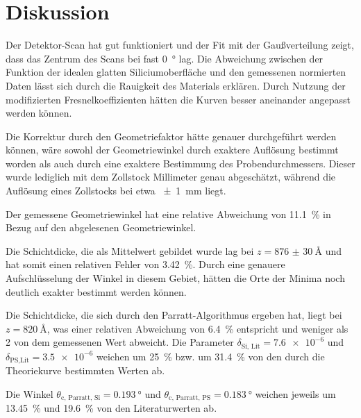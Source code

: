 \section{Diskussion}
\label{sec:Diskussion}

Der Detektor-Scan hat gut funktioniert und der Fit mit der Gaußverteilung zeigt, dass das Zentrum des Scans bei fast \SI{0}{\degree} lag. 
Die Abweichung zwischen der Funktion der idealen glatten Siliciumoberfläche und den gemessenen normierten Daten lässt sich durch die Rauigkeit des Materials erklären. Durch Nutzung der modifizierten Fresnelkoeffizienten hätten die Kurven besser aneinander angepasst werden können. 

Die Korrektur durch den Geometriefaktor hätte genauer durchgeführt werden können, wäre sowohl der Geometriewinkel durch exaktere Auflösung bestimmt worden als auch durch eine exaktere Bestimmung des Probendurchmessers. Dieser wurde lediglich mit dem Zollstock Millimeter genau abgeschätzt, während die Auflösung eines Zollstocks bei etwa \SI{\pm1}{\milli\meter} liegt.

Der gemessene Geometriewinkel hat eine relative Abweichung von \SI{11.1}{\percent} in Bezug auf den abgelesenen Geometriewinkel. 

Die Schichtdicke, die als Mittelwert gebildet wurde lag bei $z = \SI{876(30)}{\angstrom}$ und hat somit einen relativen Fehler von \SI{3.42}{\percent}. Durch eine genauere Aufschlüsselung der Winkel in diesem Gebiet, hätten die Orte der Minima noch deutlich exakter bestimmt werden können. 

Die Schichtdicke, die sich durch den Parratt-Algorithmus ergeben hat, liegt bei $z = \SI{820}{\angstrom}$, was einer relativen Abweichung von \SI{6.4}{\percent} entspricht und weniger als \SI{2}{\sigma} von dem gemessenen Wert abweicht.
Die Parameter $\delta_\text{Si, Lit}= \num{7.6e-6}$ und $\delta_\text{PS,Lit}=\num{3.5e-6}$ weichen um \SI{25}{\percent} bzw. um \SI{31.4}{\percent} von den durch die Theoriekurve bestimmten Werten ab. 

Die Winkel $\theta_\text{c, Parratt, Si}= \SI{0.193}{\degree}$ und $\theta_\text{c, Parratt, PS}= \SI{0.183}{\degree}$ weichen jeweils um \SI{13.45}{\percent} und \SI{19.6}{\percent} von den Literaturwerten ab. 

\newpage

